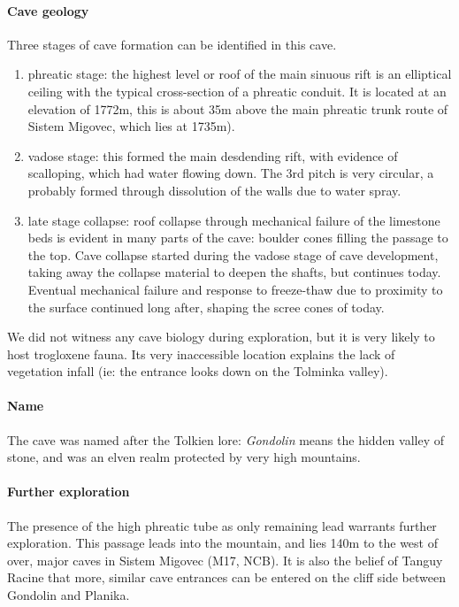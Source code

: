 \documentclass[symmetric, a4paper, 11pt]{article}
\begin{document}
\paragraph{Cave geology}
Three stages of cave formation can be identified in this cave. 
\begin{enumerate}
	\item phreatic stage: the highest level or roof of the main sinuous rift is an elliptical ceiling with the typical cross-section of a phreatic conduit. It is located at an elevation of 1772m, this is about 35m above the main phreatic trunk route of Sistem Migovec, which lies at 1735m).
	\item vadose stage: this formed the main desdending rift, with evidence of scalloping, which had water flowing down. The 3rd pitch is very circular, a probably formed through dissolution of the walls due to water spray.
	\item late stage collapse: roof collapse through mechanical failure of the limestone beds is evident in many parts of the cave: boulder cones filling the passage to the top. Cave collapse started during the vadose stage of cave development, taking away the collapse material to deepen the shafts, but continues today. Eventual mechanical failure and response to freeze-thaw due to proximity to the surface continued long after, shaping the scree cones of today. 
\end{enumerate}

We did not witness any cave biology during exploration, but it is very likely to host trogloxene fauna. Its very inaccessible location explains the lack of vegetation infall (ie: the entrance looks down on the Tolminka valley).

\paragraph{Name} The cave was named after the Tolkien lore: \emph{Gondolin} means the hidden valley of stone, and was an elven realm protected by very high mountains. 

\paragraph{Further exploration} The presence of the high phreatic tube as only remaining lead warrants further exploration. This passage leads into the mountain, and lies 140m to the west of over, major caves in Sistem Migovec (M17, NCB). It is also the belief of Tanguy Racine that more, similar cave entrances can be entered on the cliff side between Gondolin and Planika.
\end{document}
